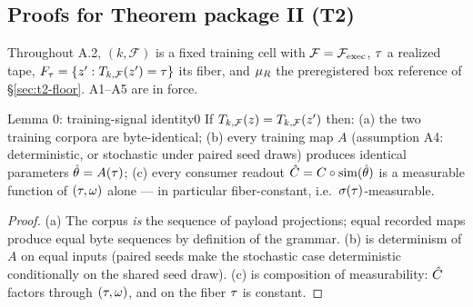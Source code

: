\subsection{Proofs for Theorem package II (T2)}
\label{app:proofs-t2}

Throughout A.2, $(k, \mathcal{F})$ is a fixed training cell with
$\mathcal{F} = \mathcal{F}_{\mathrm{exec}}$, $\tau$ a realized tape, $F_{\tau} = \{z' :
T_{k,\mathcal{F}}(z') = \tau\}$ its fiber, and $\mu_{R}$ the preregistered
box reference of \S\ref{sec:t2-floor}. A1--A5 are in force.

\begin{preregthm}{Lemma 0: training-signal identity}{0}
\label{lem:lemma0}
If $T_{k,\mathcal{F}}(z) = T_{k,\mathcal{F}}(z')$ then: (a) the two
training corpora are byte-identical; (b) every training map $A$ (assumption
A4: deterministic, or stochastic under paired seed draws) produces identical
parameters $\hat{\theta} = A(\tau)$; (c) every consumer readout
$\hat{C} = C \circ \mathrm{sim}(\hat{\theta})$ is a measurable
function of $(\tau, \omega)$ alone --- in particular fiber-constant, i.e.\
$\sigma(\tau)$-measurable.
\end{preregthm}


\begin{proof}
(a) The corpus \emph{is} the sequence of payload projections; equal recorded
maps produce equal byte sequences by definition of the grammar. (b) is
determinism of $A$ on equal inputs (paired seeds make the stochastic case
deterministic conditionally on the shared seed draw). (c) is composition of
measurability: $\hat{C}$ factors through $(\tau, \omega)$, and on the
fiber $\tau$ is constant.
\end{proof}

